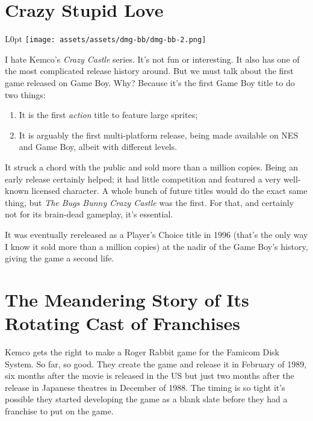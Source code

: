 \documentclass{book}
\begin{document}
\FloatBarrier\needspace{5pt}\section*{Crazy Stupid Love}\nopagebreak[4]

\begin{wrapfigure}{L}{0pt} \texttt{[image: assets/assets/dmg-bb/dmg-bb-2.png]}\end{wrapfigure}
I hate Kemco’s \emph{Crazy Castle} series. It’s not fun or interesting. It also has one of the most complicated release history around. But we must talk about the first game released on Game Boy. Why? Because it’s the first Game Boy title to do two things:

\begin{enumerate}
\item It is the first \emph{action} title to feature large sprites;
\item It is arguably the first multi-platform release, being made available on NES and Game Boy, albeit with different levels.
\end{enumerate}\noindent

It struck a chord with the public and sold more than a million copies. Being an early release certainly helped; it had little competition and featured a very well-known licensed character. A whole bunch of future titles would do the exact same thing, but \emph{The Bugs Bunny Crazy Castle} was the first. For that, and certainly not for its brain-dead gameplay, it’s essential.

It was eventually rereleased as a Player’s Choice title in 1996 (that’s the only way I know it sold more than a million copies) at the nadir of the Game Boy’s history, giving the game a second life.

\FloatBarrier\needspace{5pt}\section*{The Meandering Story of Its Rotating Cast of Franchises}\nopagebreak[4]

Kemco gets the right to make a Roger Rabbit game for the Famicom Disk System. So far, so good. They create the game and release it in February of 1989, six months after the movie is released in the US but just two months after the release in Japanese theatres in December of 1988. The timing is so tight it’s possible they started developing the game as a blank slate before they had a franchise to put on the game.
\end{document}
